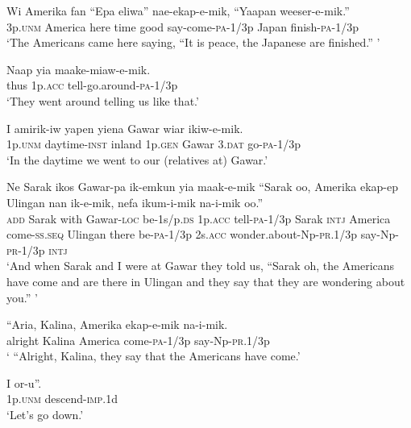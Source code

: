{\ea\label{ex:a:x98}
\gll  Wi  Amerika  fan  “Epa  eliwa”  nae-ekap-e-mik,  “Yaapan  weeser-e-mik.” \\
3p.\textsc{unm}  America  here  time  good  say-come-\textsc{pa}-1/3p    Japan  finish-\textsc{pa}-1/3p \\


\glt ‘The Americans came here saying, “It is peace, the Japanese are finished.” ’ \\
\z


\ea\label{ex:a:x99}
\gll  Naap  yia  maake-miaw-e-mik. \\
thus  1p.\textsc{acc}  tell-go.around-\textsc{pa}-1/3p \\
\glt ‘They went around telling us like that.’ \\
\z


\ea\label{ex:a:x100}
\gll  I  amirik-iw  yapen  yiena  Gawar  wiar       ikiw-e-mik. \\
1p.\textsc{unm}  daytime-\textsc{inst}  inland  1p.\textsc{gen}  Gawar  3.\textsc{dat}  go-\textsc{pa}-1/3p \\


\glt ‘In the daytime we went to our (relatives at) Gawar.’ \\
\z


\ea\label{ex:a:x101}
\gll  Ne  Sarak  ikos  Gawar-pa  ik-emkun  yia  maak-e-mik     “Sarak  oo,  Amerika  ekap-ep  Ulingan  nan  ik-e-mik,           nefa  ikum-i-mik  na-i-mik  oo.” \\
\textsc{add}  Sarak  with  Gawar-\textsc{loc}  be-1s/p.\textsc{ds}  1p.\textsc{acc}  tell-\textsc{pa}-1/3p  Sarak  \textsc{intj}  America  come-\textsc{ss.seq}  Ulingan  there  be-\textsc{pa}-1/3p    2s.\textsc{acc}  wonder.about-Np-\textsc{pr}.1/3p  say-Np-\textsc{pr}-1/3p  \textsc{intj} \\




\glt ‘And when Sarak and I were at Gawar they told us, “Sarak oh, the Americans have come and are there in Ulingan and they say that they are wondering about you.” ’ \\
\z


\ea\label{ex:a:x102}
\gll  “Aria,  Kalina,  Amerika  ekap-e-mik  na-i-mik. \\
alright  Kalina  America  come-\textsc{pa}-1/3p  say-Np-\textsc{pr}.1/3p \\
\glt ‘ “Alright, Kalina, they say that the Americans have come.’ \\
\z


\ea\label{ex:a:x103}
\gll  I  or-u”. \\
1p.\textsc{unm}  descend-\textsc{imp}.1d \\
\glt ‘Let’s go down.’ \\
\z


}
